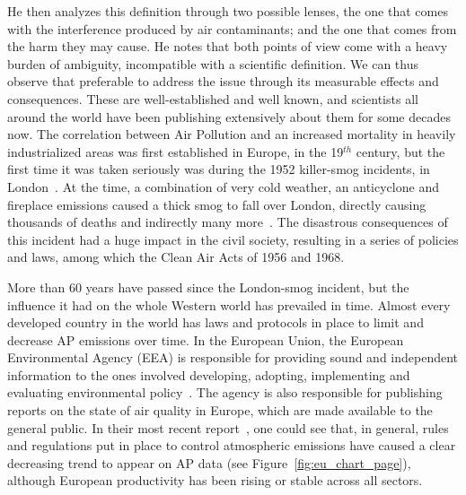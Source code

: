 He then analyzes this definition through two possible lenses, the one
that comes with the interference produced by air contaminants; and the
one that comes from the harm they may cause. He notes that both points
of view come with a heavy burden of ambiguity, incompatible with a
scientific definition. We can thus observe that preferable to address
the issue through its measurable effects and consequences. These are
well-established and well known, and scientists all around the world
have been publishing extensively about them for some decades now. The
correlation between Air Pollution and an increased mortality in heavily
industrialized areas was first established in Europe, in the 19$^{th}$
century, but the first time it was taken seriously was during the 1952
killer-smog incidents, in London~\cite{Platt2007}. At the time, a
combination of very cold weather, an anticyclone and fireplace emissions
caused a thick smog to fall over London, directly causing thousands of
deaths and indirectly many more~\cite{Bell2008,Office2019}. The
disastrous consequences of this incident had a huge impact in the civil
society, resulting in a series of policies and laws, among which the
Clean Air Acts of 1956 and 1968.

More than 60 years have passed since the London-smog incident, but the
influence it had on the whole Western world has prevailed in time.
Almost every developed country in the world has laws and protocols in
place to limit and decrease \gls{AP} emissions over time. In the
European Union, the European Environmental Agency (\gls{EEA}) is
responsible for providing sound and independent information to the ones
involved developing, adopting, implementing and evaluating environmental
policy~\cite{EEA2019}. The agency is also responsible for publishing
reports on the state of air quality in Europe, which are made available
to the general public. In their most recent report~\cite{EEA2016}, one
could see that, in general, rules and regulations put in place to
control atmospheric emissions have caused a clear decreasing trend to
appear on \gls{AP} data (see Figure~\ref{fig:eu_chart_page}), although
European productivity has been rising or stable across all sectors.

